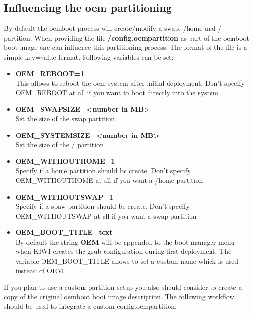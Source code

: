 \subsection{Influencing the oem partitioning}

By default the oemboot process will create/modify a swap, /home and /
partition. When providing the file \textbf{/config.oempartition} as part
of the oemboot boot image one can influence this partitioning process.
The format of the file is a simple key=value format. Following variables
can be set:

\begin{itemize}
\item \textbf{OEM\_REBOOT=1}\\
      This allows to reboot the oem system after initial deployment.
      Don't specify OEM\_REBOOT at all if you want to boot directly into
      the system
\item \textbf{OEM\_SWAPSIZE=<number in MB>}\\
      Set the size of the swap partition
\item \textbf{OEM\_SYSTEMSIZE=<number in MB>}\\
      Set the size of the / partition
\item \textbf{OEM\_WITHOUTHOME=1}\\
      Specify if a home partition should be create. Don't specify
      OEM\_WITHOUTHOME at all if you want a /home partition
\item \textbf{OEM\_WITHOUTSWAP=1}\\
      Specify if a spaw partition should be create. Don't specify
      OEM\_WITHOUTSWAP at all if you want a swap partition
\item \textbf{OEM\_BOOT\_TITLE=text}\\
      By default the string \textbf{OEM} will be appended to the
      boot manager menu when KIWI creates the grub configuration during
      first deployment. The variable OEM\_BOOT\_TITLE allows to set
      a custom name which is used instead of OEM.
\end{itemize}

If you plan to use a custom partition setup you also should consider
to create a copy of the original oemboot boot image description. The following
workflow should be used to integrate a custom config.oempartition:

